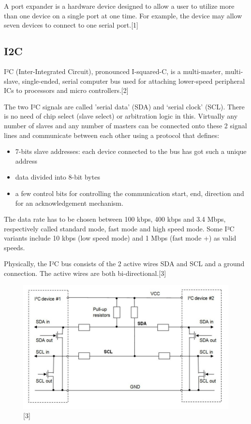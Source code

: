 \documentclass[11pt,a4paper]{article}
\begin{document}
	A port expander is a hardware device designed to allow a user to utilize more than one device on a single port at one time. For example, the device may allow seven devices to connect to one serial port.[1]
	
	\subsection{I2C}
	I²C (Inter-Integrated Circuit), pronounced I-squared-C, is a multi-master, multi-slave, single-ended, serial computer bus used for attaching lower-speed peripheral ICs to processors and micro controllers.[2]
	
	The two I²C signals are called 'serial data’ (SDA) and ‘serial clock’ (SCL). There is no need of chip select (slave select) or arbitration logic in this. Virtually any number of slaves and any number of masters can be connected onto these 2 signal lines and communicate between each other using a protocol that defines:
	\begin{itemize}
			\item 7-bits slave addresses: each device connected to the bus has got such a unique address
			\item data divided into 8-bit bytes
			\item a few control bits for controlling the communication start, end, direction and for an acknowledgement mechanism.
	\end{itemize}

	The data rate has to be chosen between 100 kbps, 400 kbps and 3.4 Mbps, respectively called standard mode, fast mode and high speed mode. Some I²C variants include 10 kbps (low speed mode) and 1 Mbps (fast mode +) as valid speeds.
	
	Physically, the I²C bus consists of the 2 active wires SDA and SCL and a ground connection. The active wires are both bi-directional.[3] 
	\begin{figure}[h!]
		\includegraphics[scale=0.4]{i2c.jpg}
		\centering
		\caption{[3]}
	\end{figure} 
	
\end{document}
